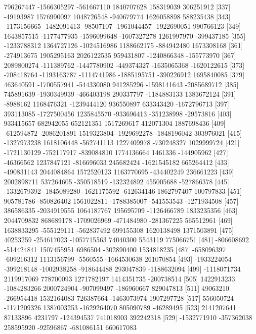 \documentclass[11pt]{article}
\begin{document}
{\begin{Schunk}
\begin{Soutput}
[331]   796267447 -1566305297  -561667110  1840707628   158319039   306251912
[337]   -49193987  1576990097  1048726548  -940679774  1626058898   588235438
[343] -1173156665 -1482091413   -98507107 -1961044457 -1922690051   990766123
[349]  1643857515 -1177477935 -1596099648 -1607327278  1261997970  -399437185
[355] -1233788312  1364727126 -1024516986  1188662175  -884942480  1673308168
[361]  -274913675  1905295163  2026122535   959431807 -1240866348  -155773970
[367]  2089800274  -111389762 -1447780902  -449374327 -1635065368 -1620122615
[373]  -708418764 -1193163787 -1114741986 -1885195751  -390226912  1695840085
[379]   463640591 -1700557941  -544330080   941285296 -1598141643 -2085689712
[385]   745891639 -1930349939  -466403198   290337797 -1184883133  1383672124
[391]    -8988162  1168476321 -1239444120   936550897   633343420 -1672796713
[397]   393113085 -1727500456  1235845570  -933696413  -351238998   -29573816
[403]   933415657   682942055   652121351  1517269617   412071304  1887698436
[409]  -612594872 -2086201891  1519323804 -1929692278 -1848196042   303976021
[415] -1327973238  1618106448  -562741113  1227409978  -730248327  1029999724
[421] -1721130129  -752117917  -839084810  1774136664     1461336  -144905962
[427]   -46366562  1237847121  -816696033   245682424 -1621545182   665264412
[433]  -490831143  2044084864  1572520123  1163770695  -434402249   236661223
[439]  2002898711   537264605  -350518519  -132324892   455005688  -527866378
[445] -1332679392 -1845089280 -1621175592  -612634146  1862797407   100797833
[451]   905781786  -850826402  1561022811 -1788385007  -541553543 -1271934508
[457]   386586335 -2034919555  1064187767   195695709 -1126466789  1833235356
[463]  2044709832   868689178 -1709026969  -471484980  -281367225   565512961
[469]  1638833295  -555129111  -562837492   699155308  1620138498  1371503891
[475]    40253259  -254617023 -1057715563    74040300     5543119   775066751
[481]  -806608692  -514424841  1507455951     6986504  -302890400  1534818235
[487]  -658096397  -609216312  1113156799    -5560555 -1664530638   261070854
[493] -1933224054  -399218148 -1002938258  -918644488   293047839 -1188632094
[499] -1118071734  2119917069   778700093  1271782197  1414351735  -200738514
[505]  1422913233 -1084283266  2000724904  -907099497  -186960667   829047813
[511]    49063210  -266954418  1532164083   726387664 -1463073974  1907297728
[517]   556050724 -1171209326  1387003253 -1629264070   805090789   -46289495
[523]  2141207641    87133896     4231797  -124394537   741018903   392242318
[529] -1532771910  -357362038   258595920   -92596867  -681086151   660617083

\end{Soutput}
\end{Schunk}}
\end{document}
